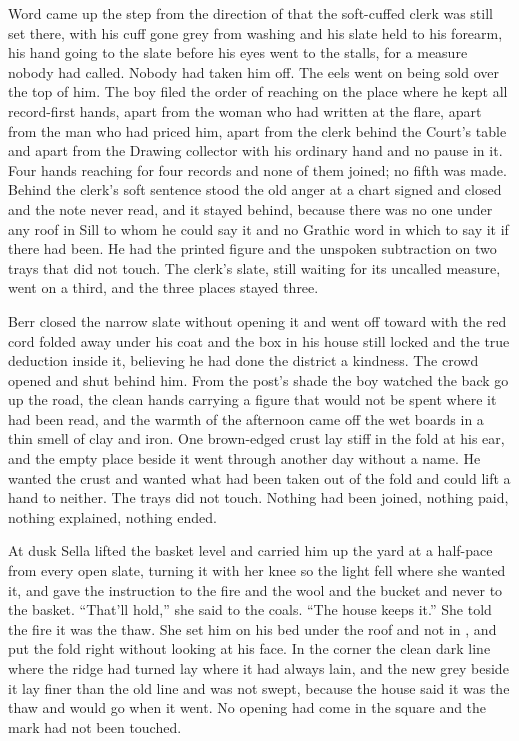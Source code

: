 Word came up the step from the direction of  that the soft-cuffed clerk was still set there, with his cuff gone grey from washing and his slate held to his forearm, his hand going to the slate before his eyes went to the stalls, for a measure nobody had called. Nobody had taken him off. The eels went on being sold over the top of him. The boy filed the order of reaching on the place where he kept all record-first hands, apart from the woman who had written at the flare, apart from the man who had priced him, apart from the clerk behind the Court's table and apart from the Drawing collector with his ordinary hand and no pause in it. Four hands reaching for four records and none of them joined; no fifth was made. Behind the clerk's soft sentence stood the old anger at a chart signed and closed and the note never read, and it stayed behind, because there was no one under any roof in Sill to whom he could say it and no Grathic word in which to say it if there had been. He had the printed figure and the unspoken subtraction on two trays that did not touch. The clerk's slate, still waiting for its uncalled measure, went on a third, and the three places stayed three.

Berr closed the narrow slate without opening it and went off toward  with the red cord folded away under his coat and the box in his house still locked and the true deduction inside it, believing he had done the district a kindness. The crowd opened and shut behind him. From the post's shade the boy watched the back go up the road, the clean hands carrying a figure that would not be spent where it had been read, and the warmth of the afternoon came off the wet boards in a thin smell of clay and iron. One brown-edged crust lay stiff in the fold at his ear, and the empty place beside it went through another day without a name. He wanted the crust and wanted what had been taken out of the fold and could lift a hand to neither. The trays did not touch. Nothing had been joined, nothing paid, nothing explained, nothing ended.

\scenebreak

At dusk Sella lifted the basket level and carried him up the yard at a half-pace from every open slate, turning it with her knee so the light fell where she wanted it, and gave the instruction to the fire and the wool and the bucket and never to the basket. “That'll hold,” she said to the coals. “The house keeps it.” She told the fire it was the thaw. She set him on his bed under the  roof and not in , and put the fold right without looking at his face. In the corner the clean dark line where the ridge had turned lay where it had always lain, and the new grey beside it lay finer than the old line and was not swept, because the house said it was the thaw and would go when it went. No opening had come in the square and the mark had not been touched.

